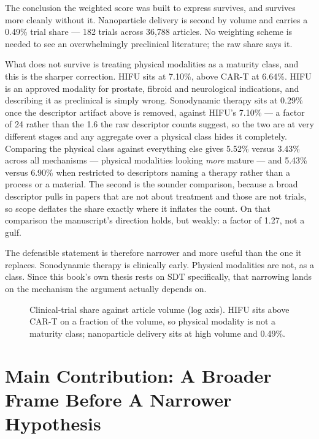 \documentclass[11pt,twoside,openright]{report}
\begin{document}
The conclusion the weighted score was built to express survives, and survives more cleanly without it. Nanoparticle delivery is second by volume and carries a 0.49\% trial share --- 182 trials across 36,788 articles. No weighting scheme is needed to see an overwhelmingly preclinical literature; the raw share says it.

What does not survive is treating physical modalities as a maturity class, and this is the sharper correction. HIFU sits at 7.10\%, above CAR-T at 6.64\%. HIFU is an approved modality for prostate, fibroid and neurological indications, and describing it as preclinical is simply wrong. Sonodynamic therapy sits at 0.29\% once the descriptor artifact above is removed, against HIFU's 7.10\% --- a factor of 24 rather than the 1.6 the raw descriptor counts suggest, so the two are at very different stages and any aggregate over a physical class hides it completely. Comparing the physical class against everything else gives 5.52\% versus 3.43\% across all mechanisms --- physical modalities looking \textit{more} mature --- and 5.43\% versus 6.90\% when restricted to descriptors naming a therapy rather than a process or a material. The second is the sounder comparison, because a broad descriptor pulls in papers that are not about treatment and those are not trials, so scope deflates the share exactly where it inflates the count. On that comparison the manuscript's direction holds, but weakly: a factor of 1.27, not a gulf.

The defensible statement is therefore narrower and more useful than the one it replaces. Sonodynamic therapy is clinically early. Physical modalities are not, as a class. Since this book's own thesis rests on SDT specifically, that narrowing lands on the mechanism the argument actually depends on.

\begin{figure}[tbp]
\setcounter{figure}{12}
\caption{Clinical-trial share against article volume (log axis). HIFU sits above CAR-T on a fraction of the volume, so physical modality is not a maturity class; nanoparticle delivery sits at high volume and 0.49\%.}
\label{fig:fig16c_trial_share}
\end{figure}

\section{Main Contribution: A Broader Frame Before A Narrower Hypothesis}
\end{document}
